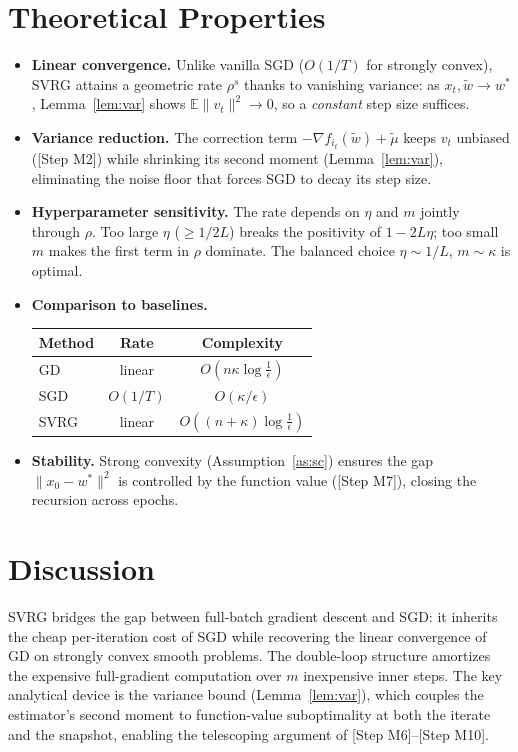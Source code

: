 \documentclass{article}
\begin{document}
\section*{Theoretical Properties}

\begin{itemize}
\item \textbf{Linear convergence.} Unlike vanilla SGD ($O(1/T)$ for strongly convex), SVRG attains a geometric rate $\rho^s$ thanks to vanishing variance: as $x_t,\tilde{w}\to w^*$, Lemma~\ref{lem:var} shows $\mathbb{E}\|v_t\|^2\to0$, so a \emph{constant} step size suffices.
\item \textbf{Variance reduction.} The correction term $-\nabla f_{i_t}(\tilde{w})+\tilde{\mu}$ keeps $v_t$ unbiased ([Step M2]) while shrinking its second moment (Lemma~\ref{lem:var}), eliminating the noise floor that forces SGD to decay its step size.
\item \textbf{Hyperparameter sensitivity.} The rate depends on $\eta$ and $m$ jointly through $\rho$. Too large $\eta$ ($\ge 1/2L$) breaks the positivity of $1-2L\eta$; too small $m$ makes the first term in $\rho$ dominate. The balanced choice $\eta\sim 1/L$, $m\sim\kappa$ is optimal.
\item \textbf{Comparison to baselines.}
\begin{center}
\begin{tabular}{lcc}
\hline
Method & Rate & Complexity \\
\hline
GD & linear & $O(n\kappa\log\tfrac1\epsilon)$ \\
SGD & $O(1/T)$ & $O(\kappa/\epsilon)$ \\
SVRG & linear & $O((n+\kappa)\log\tfrac1\epsilon)$ \\
\hline
\end{tabular}
\end{center}
\item \textbf{Stability.} Strong convexity (Assumption~\ref{as:sc}) ensures the gap $\|x_0-w^*\|^2$ is controlled by the function value ([Step M7]), closing the recursion across epochs.
\end{itemize}

\section*{Discussion}

SVRG bridges the gap between full-batch gradient descent and SGD: it inherits the cheap per-iteration cost of SGD while recovering the linear convergence of GD on strongly convex smooth problems. The double-loop structure amortizes the expensive full-gradient computation over $m$ inexpensive inner steps. The key analytical device is the variance bound (Lemma~\ref{lem:var}), which couples the estimator's second moment to function-value suboptimality at both the iterate and the snapshot, enabling the telescoping argument of [Step M6]--[Step M10].
\end{document}
